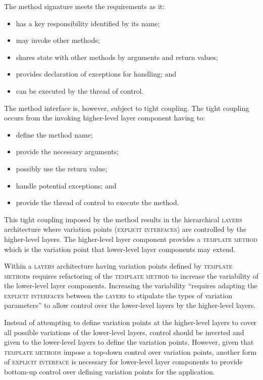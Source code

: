 \documentclass[prodmode]{style/acmlarge}
\begin{document}
The method signature meets the requirements as it:
\begin{itemize}
  \item has a key responsibility identified by its name;
  \item may invoke other methods;
  \item shares state with other methods by arguments and return values;
  \item provides declaration of exceptions for handling; and
  \item can be executed by the thread of control.
\end{itemize}

The method interface is, however, subject to tight coupling.  The tight
coupling occurs from the invoking higher-level layer component having to:
\begin{itemize}
  \item define the method name;
  \item provide the necessary arguments;
  \item possibly use the return value;
  \item handle potential exceptions; and
  \item provide the thread of control to execute the method.
\end{itemize}

This tight coupling imposed by the method results in the hierarchical
\textsc{layers} architecture where variation points (\textsc{explicit
interfaces}) are controlled by the higher-level layers.  The higher-level layer
component provides a \textsc{template method} \cite{gof} which is the variation
point that lower-level layer components may extend.

Within a \textsc{layers} architecture having variation points defined by
\textsc{template method}s requires refactoring of the \textsc{template method}
to increase the variability of the lower-level layer components.  Increasing the
variability ``requires adapting the \textsc{explicit interfaces} between the
\textsc{layers} to stipulate the types of variation parameters'' \cite[p.
5]{ioc} to allow control over the lower-level layers by the higher-level layers.

Instead of attempting to define variation points at the higher-level layers to
cover all possible variations of the lower-level layers, control should be
inverted and given to the lower-level layers to define the variation points. 
However, given that \textsc{template methods} impose a top-down control over
variation points, another form of \textsc{explicit interface} is necessary for
lower-level layer components to provide bottom-up control over defining
variation points for the application.
\end{document}

